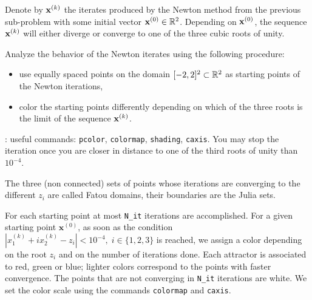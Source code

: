 \begin{problem}
\begin{subproblem}[4] \label{subprb:JuliaSet_3}
Denote by ${\mathbf{x}}^{(k)}$ the iterates produced by the Newton method from the previous sub-problem with some initial vector ${\mathbf{x}}^{(0)}\in\mathbb{R}^{2}$.
Depending on ${\mathbf{x}}^{(0)}$, the sequence ${\mathbf{x}}^{(k)}$ will either diverge or converge to one of the three cubic roots of unity.

    Analyze the behavior of the Newton iterates using the following procedure:
    \begin{itemize}
    \item use equally spaced points on the domain $[-2,2]^2\subset\mathbb{R}^2$ as starting points of the Newton iterations,
    \item color the starting points differently depending on which of the three roots is the limit of the sequence ${\mathbf{x}}^{(k)}$.
    \end{itemize}

    \hint: useful \Matlab commands: \texttt{pcolor}, \texttt{colormap},
    \texttt{shading}, \texttt{caxis}. You may stop the iteration once you are
    closer in distance to one of the third roots of unity than $10^{-4}$.

The three (non connected) sets of points whose iterations are converging to the different $z_i$ are called Fatou domains, their boundaries are the Julia sets.

\begin{solution}
For each starting point at most \texttt{N\_it} iterations are accomplished.
For a given starting point $\mathbf{x}^{(0)}$, as soon as the condition $|{x}^{(k)}_1+i{x}^{(k)}_2-z_i| < 10^{-4},\; i\in\{1,2,3\}$ is reached, we assign a color depending on the root $z_i$ and on the number of iterations done.
Each attractor is associated to red, green or blue; lighter colors correspond to the points with faster convergence.
The points that are not converging in \texttt{N\_it} iterations are white.
We set the color scale using the \Matlab commands \texttt{colormap} and \texttt{caxis}.



\end{solution}
\end{subproblem}
\end{problem}
